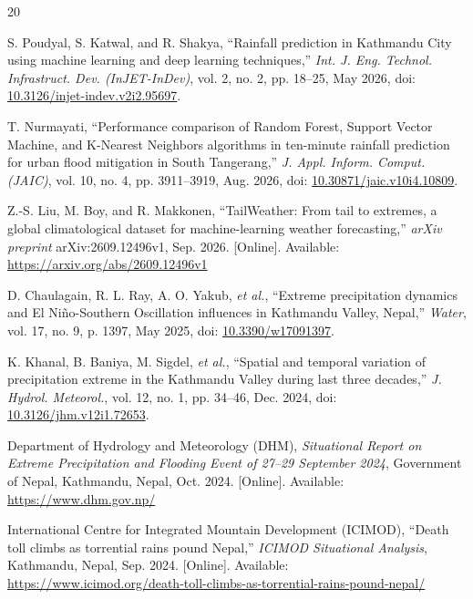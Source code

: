 \documentclass[10pt,twocolumn,a4paper]{article}
\begin{document}
\begin{thebibliography}{20}
\scriptsize\raggedright
\setlength{\itemsep}{0pt}\setlength{\parskip}{0pt}

 S. Poudyal, S. Katwal, and R. Shakya, ``Rainfall prediction in Kathmandu City using machine learning and deep learning techniques,'' \textit{Int. J. Eng. Technol. Infrastruct. Dev. (InJET-InDev)}, vol. 2, no. 2, pp. 18--25, May 2026, doi: \href{https://doi.org/10.3126/injet-indev.v2i2.95697}{10.3126/injet-indev.v2i2.95697}.

 T. Nurmayati, ``Performance comparison of Random Forest, Support Vector Machine, and K-Nearest Neighbors algorithms in ten-minute rainfall prediction for urban flood mitigation in South Tangerang,'' \textit{J. Appl. Inform. Comput. (JAIC)}, vol. 10, no. 4, pp. 3911--3919, Aug. 2026, doi: \href{https://doi.org/10.30871/jaic.v10i4.10809}{10.30871/jaic.v10i4.10809}.

 Z.-S. Liu, M. Boy, and R. Makkonen, ``TailWeather: From tail to extremes, a global climatological dataset for machine-learning weather forecasting,'' \textit{arXiv preprint} arXiv:2609.12496v1, Sep. 2026. [Online]. Available: \href{https://arxiv.org/abs/2609.12496v1}{https://arxiv.org/abs/2609.12496v1}

 D. Chaulagain, R. L. Ray, A. O. Yakub, \textit{et al.}, ``Extreme precipitation dynamics and El Ni\~{n}o-Southern Oscillation influences in Kathmandu Valley, Nepal,'' \textit{Water}, vol. 17, no. 9, p. 1397, May 2025, doi: \href{https://doi.org/10.3390/w17091397}{10.3390/w17091397}.

 K. Khanal, B. Baniya, M. Sigdel, \textit{et al.}, ``Spatial and temporal variation of precipitation extreme in the Kathmandu Valley during last three decades,'' \textit{J. Hydrol. Meteorol.}, vol. 12, no. 1, pp. 34--46, Dec. 2024, doi: \href{https://doi.org/10.3126/jhm.v12i1.72653}{10.3126/jhm.v12i1.72653}.

 Department of Hydrology and Meteorology (DHM), \textit{Situational Report on Extreme Precipitation and Flooding Event of 27--29 September 2024}, Government of Nepal, Kathmandu, Nepal, Oct. 2024. [Online]. Available: \href{https://www.dhm.gov.np/uploads/dhm/downloads/Situational_Report_on_Extreme_Precipitation_and_Flooding_Event_of_27-29_September_2024.pdf}{https://www.dhm.gov.np/}

 International Centre for Integrated Mountain Development (ICIMOD), ``Death toll climbs as torrential rains pound Nepal,'' \textit{ICIMOD Situational Analysis}, Kathmandu, Nepal, Sep. 2024. [Online]. Available: \href{https://www.icimod.org/death-toll-climbs-as-torrential-rains-pound-nepal/}{https://www.icimod.org/death-toll-climbs-as-torrential-rains-pound-nepal/}


\end{thebibliography}
\end{document}
